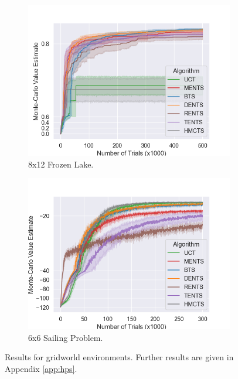             \begin{figure}
                \centering
                \begin{subfigure}[b]{0.49\textwidth}
                    \centering
                    \includegraphics[width=\textwidth]{figures/temp/grid/fl.png}
                    \caption{8x12 Frozen Lake.}
                    \label{fig:fl}
                \end{subfigure}
                \begin{subfigure}[b]{0.49\textwidth}
                    \centering
                    \includegraphics[width=\textwidth]{figures/temp/grid/s.png}
                    \caption{6x6 Sailing Problem.}
                    \label{fig:sp}
                \end{subfigure}
                \caption{Results for gridworld environments. Further results are given in Appendix \ref{app:hps}. }
                \label{fig:gridworld_results}
            \end{figure}





